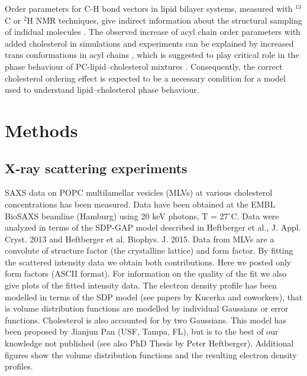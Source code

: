 \documentclass[aps,prl,superscriptaddress,twocolumn]{revtex4}
\begin{document}


Order parameters for C-H bond vectors in lipid bilayer systems, measured
with $^{13}$C or $^{2}$H NMR techniques, give indirect information about the structural
sampling of indidual molecules \cite{ollila16}. The observed increase of
acyl chain order parameters with added cholesterol in simulations and
experiments can be explained by increased trans conformations in acyl chains \cite{ferreira13,??},
which is suggested to play critical role in the phase behaviour of PC-lipid--cholesterol
mixtures \cite{ipsen87}. Consequently, the correct cholesterol ordering effect is
expected to be a necessary condition for a model used to understand lipid--cholesterol
phase behaviour.

\section{Methods}

\subsection{X-ray scattering experiments}

SAXS data on POPC multilamellar vesicles (MLVs) at various cholesterol concentrations
has been measured. Data have been obtained at the EMBL BioSAXS beamline (Hamburg) using 20 keV photons, T = 27$^\circ$C. Data were analyzed in terms of the SDP-GAP model described in Heftberger et al., J. Appl. Cryst. 2013 and Heftberger et al. Biophys. J. 2015. Data from MLVs are a convolute of structure factor (the crystalline lattice) and form factor. By fitting the scattered intensity data we obtain both contributions. Here we posted only form factors (ASCII format). For information on the quality of the fit we also give plots of the fitted intensity data. The electron density profile has been modelled in terms of the SDP model (see papers by Kucerka and coworkers), that is volume distribution functions are modelled by individual Gaussians or error functions. Cholesterol is also accounted for by two Gaussians. This model has been proposed by Jianjun Pan (USF, Tampa, FL), but is to the best of our knowledge not published (see also PhD Thesis by Peter Heftberger). Additional figures show the volume distribution functions and the resulting electron density profiles.
\end{document}
